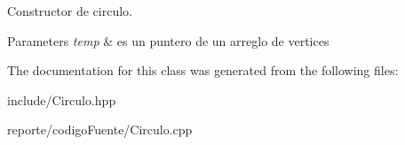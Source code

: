Constructor de circulo. 


\begin{DoxyParams}{Parameters}
{\em temp} & es un puntero de un arreglo de vertices \\
\hline
\end{DoxyParams}


The documentation for this class was generated from the following files\+:\begin{DoxyCompactItemize}
\item 
include/Circulo.\+hpp\item 
reporte/codigo\+Fuente/Circulo.\+cpp\end{DoxyCompactItemize}
